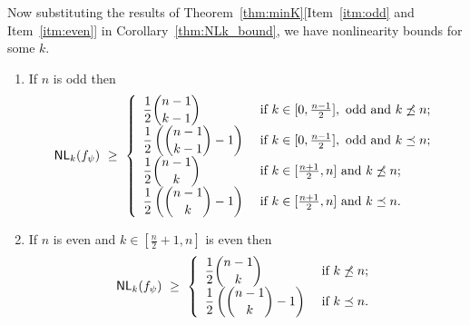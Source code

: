 \documentclass{llncs}
\begin{document}
Now substituting the results of Theorem~\ref{thm:minK}[Item~\ref{itm:odd} and Item~\ref{itm:even}] in Corollary~\ref{thm:NLk_bound}, we have nonlinearity bounds for some $k$.
\begin{theorem}\label{thm:NLk_bound2}
\begin{enumerate}
\item If $n$ is odd then
$$\mathsf{NL}_{k}(f_\psi) ~\geq ~ 
\left\{ \begin{array}{ll}
\displaystyle{\frac{1}{2}{n-1 \choose k-1}}  & \text{ if }  k \in [0,\frac{n-1}{2}], \text{ odd and } k \not\preceq n; \\
\displaystyle{\frac{1}{2}\left({n-1 \choose k-1} - 1\right)} & \text{ if } k \in [0,\frac{n-1}{2}], \text{ odd and } k \preceq n; \\
\displaystyle{\frac{1}{2}{n-1 \choose k}}  & \text{ if }  k \in [\frac{n+1}{2},n] \text{ and } k \not\preceq n; \\
\displaystyle{\frac{1}{2}\left({n-1 \choose k} - 1\right)}  & \text{ if }  k \in [\frac{n+1}{2},n] \text{ and } k \preceq n.
\end{array}  \right.$$
\item If $n$ is even and $k \in [\frac{n}{2}+1, n]$ is even then 
$$\mathsf{NL}_{k}(f_\psi) ~\geq ~ 
\left\{ \begin{array}{ll}
\displaystyle{\frac{1}{2}{n-1 \choose k}}  & \text{ if }  k \not\preceq n; \\
\displaystyle{\frac{1}{2}\left({n-1 \choose k} - 1\right)} & \text{ if } k \preceq n.
\end{array}  \right.$$
\end{enumerate}
\end{theorem}
\end{document}
